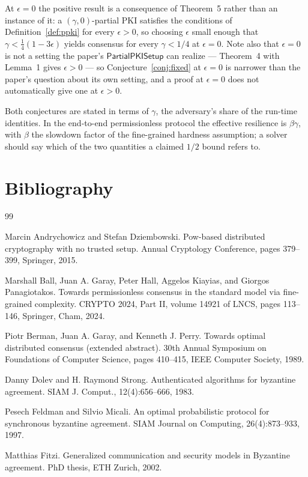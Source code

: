 \documentclass{conjura-conjecture}
\newcommand{\PPKISetup}{\mathsf{PartialPKISetup}}
\begin{document}
\begin{remark}
At $\epsilon = 0$ the positive result is a consequence of Theorem~5
rather than an instance of it: a $(\gamma,0)$-partial PKI satisfies the
conditions of Definition~\ref{def:ppki} for every $\epsilon > 0$, so
choosing $\epsilon$ small enough that $\gamma < \frac{1}{4}(1-3\epsilon)$
yields consensus for every $\gamma < 1/4$ at $\epsilon = 0$. Note also
that $\epsilon = 0$ is not a setting the paper's $\PPKISetup$ can
realize --- Theorem~4 with Lemma~1 gives $\epsilon > 0$ --- so
Conjecture~\ref{conj:fixed} at $\epsilon = 0$ is narrower than the
paper's question about its own setting, and a proof at $\epsilon = 0$
does not automatically give one at $\epsilon > 0$.
\end{remark}

\begin{remark}
Both conjectures are stated in terms of $\gamma$, the adversary's share
of the run-time identities. In the end-to-end permissionless protocol
the effective resilience is $\beta\gamma$, with $\beta$ the slowdown
factor of the fine-grained hardness assumption; a solver should say
which of the two quantities a claimed $1/2$ bound refers to.
\end{remark}

\section{Bibliography}

\begin{conjurabibliography}{99}

Marcin Andrychowicz and Stefan Dziembowski.
Pow-based distributed cryptography with no trusted setup.
Annual Cryptology Conference, pages 379--399, Springer, 2015.

Marshall Ball, Juan A. Garay, Peter Hall, Aggelos Kiayias, and Giorgos
Panagiotakos.
Towards permissionless consensus in the standard model via fine-grained
complexity.
CRYPTO 2024, Part II, volume 14921 of LNCS, pages 113--146, Springer,
Cham, 2024.

Piotr Berman, Juan A. Garay, and Kenneth J. Perry.
Towards optimal distributed consensus (extended abstract).
30th Annual Symposium on Foundations of Computer Science, pages
410--415, IEEE Computer Society, 1989.

Danny Dolev and H. Raymond Strong.
Authenticated algorithms for byzantine agreement.
SIAM J. Comput., 12(4):656--666, 1983.

Pesech Feldman and Silvio Micali.
An optimal probabilistic protocol for synchronous byzantine agreement.
SIAM Journal on Computing, 26(4):873--933, 1997.

Matthias Fitzi.
Generalized communication and security models in Byzantine agreement.
PhD thesis, ETH Zurich, 2002.

\end{conjurabibliography}
\end{document}
